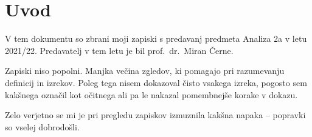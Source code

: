 \section*{Uvod}

V tem dokumentu so zbrani moji zapiski s predavanj predmeta Analiza
2a v letu 2021/22. Predavatelj v tem letu je bil prof.~dr.~Miran
Černe.

Zapiski niso popolni. Manjka večina zgledov, ki pomagajo pri
razumevanju definicij in izrekov. Poleg tega nisem dokazoval čisto
vsakega izreka, pogosto sem kakšnega označil kot očitnega ali pa le
nakazal pomembnejše korake v dokazu.

Zelo verjetno se mi je pri pregledu zapiskov izmuznila kakšna napaka
-- popravki so vselej dobrodošli.
